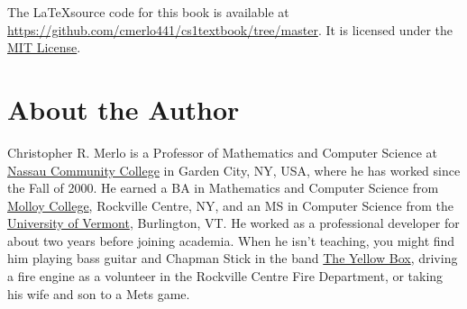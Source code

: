 The \LaTeX source code for this book is available at \href{https://github.com/cmerlo441/cs1textbook/tree/master}{https://github.com/cmerlo441/cs1textbook/tree/master}.  It is licensed under the \href{https://github.com/cmerlo441/cs1textbook/blob/master/LICENSE}{MIT License}.

\section{About the Author}

Christopher R. Merlo is a Professor of Mathematics and Computer Science at \href{http://www.matcmp.ncc.edu/~cmerlo/}{Nassau Community College} in Garden City, NY, USA, where he has worked since the Fall of 2000.  He earned a BA in Mathematics and Computer Science from \href{http://www.molloy.edu/}{Molloy College}, Rockville Centre, NY, and an MS in Computer Science from the \href{http://www.uvm.edu/cems/cs}{University of Vermont}, Burlington, VT.  He worked as a professional developer for about two years before joining academia.  When he isn't teaching, you might find him playing bass guitar and Chapman Stick in the band \href{http://www.theyellowbox.com/}{The Yellow Box}, driving a fire engine as a volunteer in the Rockville Centre Fire Department, or taking his wife and son to a Mets game.
